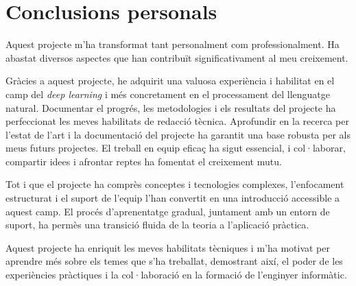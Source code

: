 \section{Conclusions personals}
Aquest projecte m'ha transformat tant personalment com professionalment. Ha abastat diversos aspectes que han contribuït significativament al meu creixement.

Gràcies a aquest projecte, he adquirit una valuosa experiència i habilitat en el camp del \textit{deep learning} i més concretament en el processament del llenguatge natural. Documentar el progrés, les metodologies i els resultats del projecte ha perfeccionat les meves habilitats de redacció tècnica. Aprofundir en la recerca per l'estat de l'art i la documentació del projecte ha garantit una base robusta per als meus futurs projectes. El treball en equip eficaç ha sigut essencial, i col·laborar, compartir idees i afrontar reptes ha fomentat el creixement mutu. 

Tot i que el projecte ha comprès conceptes i tecnologies complexes, l'enfocament estructurat i el suport de l'equip l'han convertit en una introducció accessible a aquest camp. El procés d'aprenentatge gradual, juntament amb un entorn de suport, ha permès una transició fluida de la teoria a l'aplicació pràctica. 

Aquest projecte ha enriquit les meves habilitats tècniques i m'ha motivat per aprendre més sobre els temes que s'ha treballat, demostrant així, el poder de les experiències pràctiques i la col·laboració en la formació de l'enginyer informàtic.
